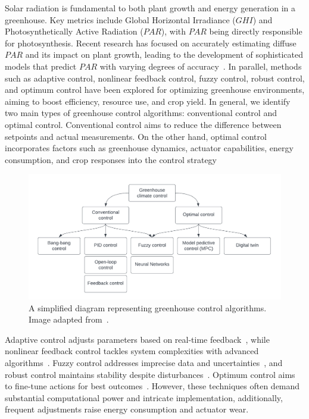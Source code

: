 \documentclass[conference]{IEEEtran}
\begin{document}
Solar radiation is fundamental to both plant growth and energy generation in a greenhouse. Key metrics include Global Horizontal Irradiance ($GHI$) and Photosynthetically Active Radiation ($PAR$), with $PAR$ being directly responsible for photosynthesis. Recent research has focused on accurately estimating diffuse $PAR$ and its impact on plant growth, leading to the development of sophisticated models that predict $PAR$ with varying degrees of accuracy~\cite{Iddio2020, MaLu2022}. In parallel, methods such as adaptive control, nonlinear feedback control, fuzzy control, robust control, and optimum control have been explored for optimizing greenhouse environments, aiming to boost efficiency, resource use, and crop yield. In general, we identify two main types of greenhouse control algorithms: conventional control and optimal control. Conventional control aims to reduce the difference between setpoints and actual measurements. On the other hand, optimal control incorporates factors such as greenhouse dynamics, actuator capabilities, energy consumption, and crop responses into the control strategy

\begin{figure}
    \centering
    \includegraphics[width=.5\textwidth]{images/flowchart.pdf}
    \caption{A simplified diagram representing greenhouse control algorithms. Image adapted from~\cite{Trepanier2024}.}
    \label{fig:flowchart}
\end{figure}

Adaptive control adjusts parameters based on real-time feedback~\cite{Tian2022}, while nonlinear feedback control tackles system complexities with advanced algorithms~\cite{Bood2023}. Fuzzy control addresses imprecise data and uncertainties~\cite{smartcities7030055}, and robust control maintains stability despite disturbances~\cite{Zhang2021}. Optimum control aims to fine-tune actions for best outcomes~\cite{Debroy2024, SVENSEN2024108578}. However, these techniques often demand substantial computational power and intricate implementation, additionally, frequent adjustments raise energy consumption and actuator wear.
\end{document}

